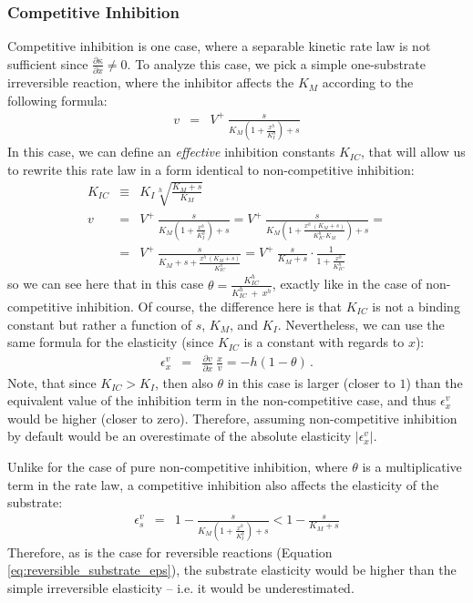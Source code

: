 \documentclass[12pt,a4paper]{article}
\begin{document}
\subsubsection{Competitive Inhibition}
Competitive inhibition is one case, where a separable kinetic rate law is not sufficient since $\frac{\partial \kappa}{\partial x} \neq 0$. To analyze this case, we pick a simple one-substrate irreversible reaction, where the inhibitor affects the $K_M$ according to the following formula:
\begin{eqnarray}
    v &=& V^+ ~ \frac{s}{K_M \left(1 + \frac{x^h}{K_I^h}\right) + s}
\end{eqnarray}
In this case, we can define an \emph{effective} inhibition constants $K_{IC}$, that will allow us to rewrite this rate law in a form identical to non-competitive inhibition:
\begin{eqnarray}
    K_{IC} &\equiv& K_I \sqrt[h]{\frac{K_M + s}{K_M}} \nonumber\\
    v &=& V^+ ~ \frac{s}{K_M \left(1 + \frac{x^h}{K_I^h}\right) + s} =
          V^+ ~ \frac{s}{K_M \left(1 + \frac{x^h~(K_M + s)}{K_{IC}^h~K_M}\right) + s} = \nonumber\\
      &=& V^+ ~ \frac{s}{K_M + s + \frac{x^h~(K_M + s)}{K_{IC}^h}} = 
          V^+ ~ \frac{s}{K_M + s} \cdot \frac{1}{1 + \frac{x^h}{K_{IC}^h}} \label{eq:eps_comp_inh}
\end{eqnarray}
so we can see here that in this case $\theta = \frac{K_{IC}^h}{K_{IC}^h~+~x^h}$, exactly like in the case of non-competitive inhibition. Of course, the difference here is that $K_{IC}$ is not a binding constant but rather a function of $s$, $K_M$, and $K_I$. Nevertheless, we can use the same formula for the elasticity (since $K_{IC}$ is a constant with regards to $x$):
\begin{eqnarray}
    \epsilon_x^v &=& \frac{\partial v}{\partial x}~\frac{x}{v} = -h(1 - \theta)\,.
\end{eqnarray}
Note, that since $K_{IC} > K_I$, then also $\theta$ in this case is larger (closer to $1$) than the equivalent value of the inhibition term in the non-competitive case, and thus $\epsilon_x^v$ would be higher (closer to zero). Therefore, assuming non-competitive inhibition by default would be an overestimate of the absolute elasticity $|\epsilon_x^v|$.

Unlike for the case of pure non-competitive inhibition, where $\theta$ is a multiplicative term in the rate law, a competitive inhibition also affects the elasticity of the substrate:
\begin{eqnarray}
\epsilon_{s}^v &=& 1 - \frac{s}{K_M \left(1 + \frac{x^h}{K_I^h}\right)+ s} < 1 - \frac{s}{K_M + s}
\end{eqnarray}
Therefore, as is the case for reversible reactions (Equation \ref{eq:reversible_substrate_eps}), the substrate elasticity would be higher than the simple irreversible elasticity -- i.e. it would be underestimated.
\end{document}
